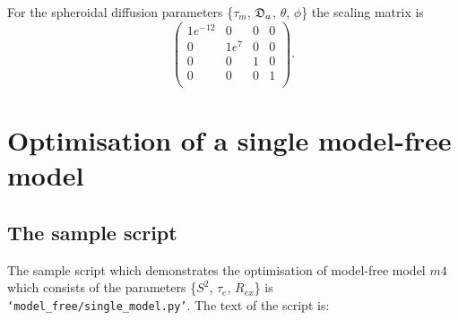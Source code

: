 \begin{htmlonly}
\begin{htmlonly}
\noindent  For the spheroidal diffusion parameters \{$\tau_m$, $\mathfrak{D}_a$, $\theta$, $\phi$\} the scaling matrix is
\begin{equation}
    \begin{pmatrix}
        1e^{-12} &  0 &  0 &  0 \\
        0 &  1e^7 &  0 &  0 \\
        0 &  0 &  1 &  0 \\
        0 &  0 &  0 &  1 \\
    \end{pmatrix}.
\end{equation}





\section{Optimisation of a single model-free model}\label{sect: single mf model}



\subsection{The sample script}

The sample script which demonstrates the optimisation of model-free model $m4$ which consists of the parameters \{$S^2$, $\tau_e$, $R_{ex}$\} is \texttt{`model\_free/single\_model.py'}.  The text of the script is:


\end{htmlonly}
\end{htmlonly}
